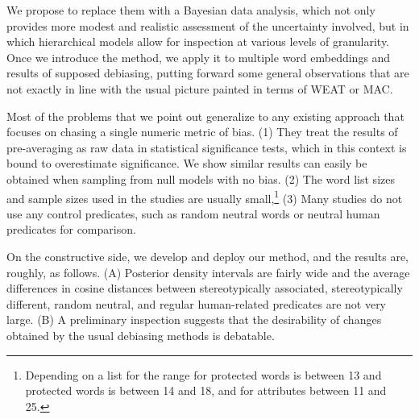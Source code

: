 \documentclass{clv3}
\begin{document}
We propose to replace them with a Bayesian data analysis, which not only
provides more modest and realistic assessment of the uncertainty
involved, but in which hierarchical models allow for inspection at
various levels of granularity. Once we introduce the method, we apply it
to multiple word embeddings and results of supposed debiasing, putting
forward some general observations that are not exactly in line with the
usual picture painted in terms of \textsf{WEAT} or \textsf{MAC}.

Most of the problems that we point out generalize to any existing
approach that focuses on chasing a single numeric metric of bias. (1)
They treat the results of pre-averaging as raw data in statistical
significance tests, which in this context is bound to overestimate
significance. We show similar results can easily be obtained when
sampling from null models with no bias. (2) The word list sizes and
sample sizes used in the studies are usually small,\footnote{Depending
  on a list for \citep{Caliskan2017semanticsBiases} the range for protected words is between 13 and
  protected words is between 14 and 18, and for attributes between 11
  and 25.} (3) Many studies do not use any control predicates, such as
random neutral words or neutral human predicates for comparison.

On the constructive side, we develop and deploy our method, and the
results are, roughly, as follows. (A) Posterior density intervals are
fairly wide and the average differences in cosine distances between stereotypically associated, stereotypically different,  
random neutral, and regular human-related predicates are not very large. (B) A preliminary inspection suggests that the desirability of changes obtained by the
usual debiasing methods is debatable.
\end{document}
